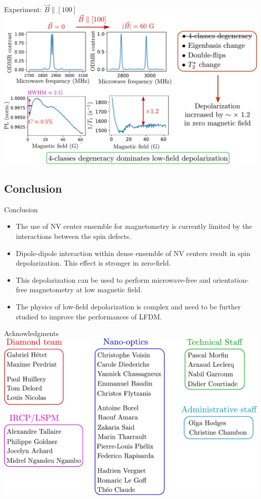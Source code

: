 \documentclass{beamer}
\begin{document}
\begin{frame}{Experiment: $\vec B \parallel [100]$}
\centering
\includegraphics[width=\textwidth,height=0.85\textheight,keepaspectratio]{Slide_T1_PL_100_f}
\end{frame}

\subsection{Conclusion}
\begin{frame}{Conclusion}
\begin{itemize}
\item The use of NV center ensemble for magnetometry is currently limited by the interactions between the spin defects.
\pause
\bigskip
\item Dipole-dipole interaction within dense ensemble of NV centers result in spin depolarization. This effect is stronger in zero-field.
\pause
\bigskip
\item This depolarization can be used to perform microwave-free and orientation-free magnetometry at low magnetic field.
\pause
\bigskip
\item The physics of low-field depolarization is complex and need to be further studied to improve the performances of LFDM.
\end{itemize}

\end{frame}

\begin{frame}{Acknowledgments}
\centering
\includegraphics[width=\textwidth,height=0.85\textheight,keepaspectratio]{Remerciements}
\end{frame}
\end{document}
